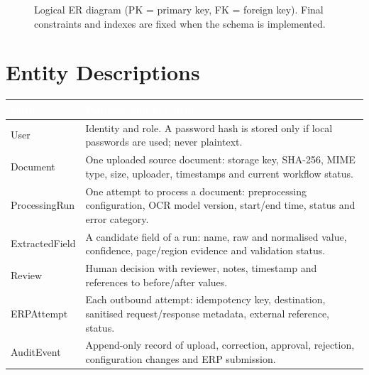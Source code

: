\documentclass[11pt,a4paper]{report}
\newcommand{\hdr}[1]{\textcolor{white}{\sffamily\bfseries #1}}
\newcommand{\tblstart}{\rowcolors{2}{white}{rowgray}\arrayrulecolor{teal!60}}
\newcommand{\hdrrow}{\rowcolor{navy}}
\begin{document}
\begin{figure}[H]
{
}
\caption{Logical ER diagram (PK = primary key, FK = foreign key). Final constraints and indexes are fixed when the schema is implemented.}\label{fig:er}
\end{figure}

\section{Entity Descriptions}
{\tblstart\small
\begin{longtable}{L{3.0cm}L{10.8cm}}
\hdrrow \hdr{Entity} & \hdr{Purpose and key fields}\\ \endhead
User & Identity and role. A password hash is stored only if local passwords are used; never plaintext.\\
Document & One uploaded source document: storage key, SHA-256, MIME type, size, uploader, timestamps and current workflow status.\\
ProcessingRun & One attempt to process a document: preprocessing configuration, OCR model version, start/end time, status and error category.\\
ExtractedField & A candidate field of a run: name, raw and normalised value, confidence, page/region evidence and validation status.\\
Review & Human decision with reviewer, notes, timestamp and references to before/after values.\\
ERPAttempt & Each outbound attempt: idempotency key, destination, sanitised request/response metadata, external reference, status.\\
AuditEvent & Append-only record of upload, correction, approval, rejection, configuration changes and ERP submission.\\
\hline
\end{longtable}}
\end{document}
